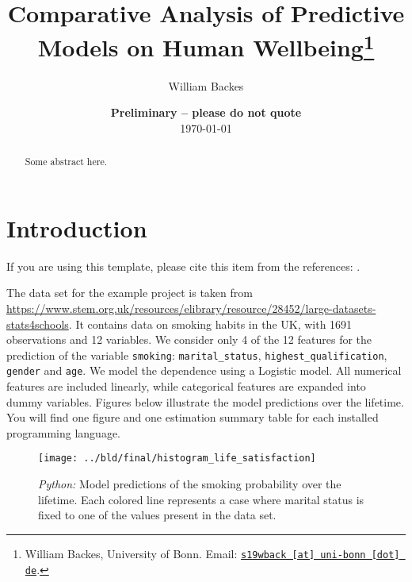 \documentclass[11pt, a4paper, leqno]{article}
\begin{document}
\title{Comparative Analysis of Predictive Models on Human Wellbeing\thanks{William Backes, University of Bonn. Email: \href{mailto:s19wback@uni-bonn.de}{\nolinkurl{s19wback [at] uni-bonn [dot] de}}.}}

\author{William Backes}

\date{
    {\bf Preliminary -- please do not quote}
    \\[1ex]
    \today
}

\maketitle


\begin{abstract}
    Some abstract here.
\end{abstract}

\clearpage


\section{Introduction} %
\label{sec:introduction}

If you are using this template, please cite this item from the references:
\citet{GaudeckerEconProjectTemplates}.

The data set for the example project is taken from
\url{https://www.stem.org.uk/resources/elibrary/resource/28452/large-datasets-stats4schools}.
It contains data on smoking habits in the UK, with 1691 observations and 12 variables.
We consider only 4 of the 12 features for the prediction of the variable
\texttt{smoking}: \texttt{marital\_status}, \texttt{highest\_qualification},
\texttt{gender} and \texttt{age}. We model the dependence using a Logistic model. All
numerical features are included linearly, while categorical features are expanded into
dummy variables. Figures below illustrate the model predictions over the lifetime. You
will find one figure and one estimation summary table for each installed programming
language.



\begin{figure}[htbp]
    \centering
    \texttt{[image: ../bld/final/histogram\_life\_satisfaction]}
    \caption{\emph{Python:} Model predictions of the smoking probability over the lifetime. Each colored line represents a case where marital status is fixed to one of the values present in the data set.}
    \label{fig:histogram_life_satisfaction}
\end{figure}
\end{document}
